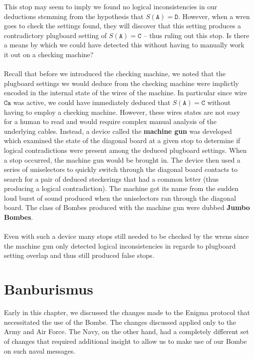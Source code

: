 This stop may seem to imply we found no logical inconsistencies in our
deductions stemming from the hypothesis that $S(\texttt{A}) =
\texttt{D}$. However, when a wren goes to check the settings found,
they will discover that this setting produces a contradictory
plugboard setting of $S(\texttt{A}) = \texttt{C}$ -- thus ruling out
this stop. Is there a means by which we could have detected this
without having to manually work it out on a checking machine?
\\\\Recall that before we introduced the checking machine, we noted
that the plugboard settings we would deduce from the checking machine
were implictly encoded in the internal state of the wires of the
machine. In particular since wire $\texttt{Ca}$ was active, we could
have immediately deduced that $S(\texttt{A})= \texttt{C}$ without
having to employ a checking machine. However, these wires states are
not easy for a human to read and would require complex manual
analysis of the underlying cables. Instead, a device called the
{\bf{machine gun}} was developed which examined the state of the
diagonal board at a given stop to determine if logical contradictions
were present among the deduced plugboard settings. When a stop
occurred, the machine gun would be brought in. The device then used a
series of uniselectors to quickly switch through the diagonal board
contacts to search for a pair of deduced steckerings that had a
common letter (thus producing a logical contradiction). The machine
got its name from the sudden loud burst of sound produced when the
uniselectors ran through the diagonal board. The class of Bombes
produced with the machine gun were dubbed {\bf{Jumbo Bombes}}.
\\\\Even with such a device many stops still needed to be checked by
the wrens since the machine gun only detected logical inconsistencies
in regards to plugboard setting overlap and thus still produced false stops.

\section{Banburismus}\label{banburismus}
Early in this chapter, we discussed the changes made to the Enigma
protocol that necessitated the use of the Bombe. The changes
discussed applied only to the Army and Air Force. The Navy, on the
other hand, had a completely different set of changes that required
additional insight to allow us to make use of our Bombe on such naval messages.

